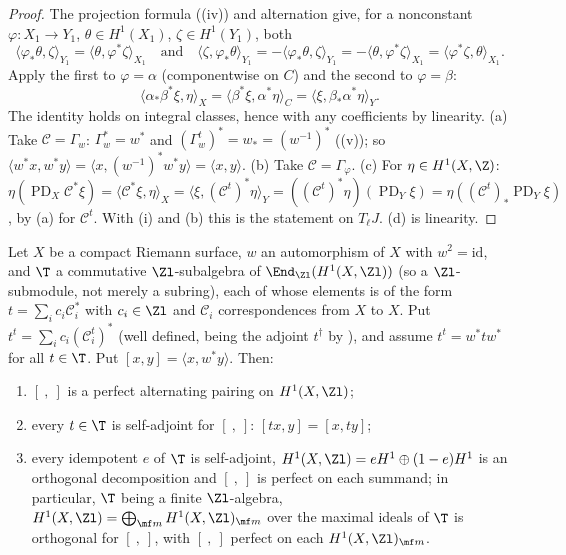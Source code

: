 \begin{proof}
The projection formula ((iv)) and alternation give, for a nonconstant $\varphi\colon X_1\to Y_1$, $\theta\in H^1(X_1)$, $\zeta\in H^1(Y_1)$, both
\[
\langle\varphi_*\theta,\zeta\rangle_{Y_1}=\langle\theta,\varphi^*\zeta\rangle_{X_1}\quad\text{and}\quad\langle\zeta,\varphi_*\theta\rangle_{Y_1}=-\langle\varphi_*\theta,\zeta\rangle_{Y_1}=-\langle\theta,\varphi^*\zeta\rangle_{X_1}=\langle\varphi^*\zeta,\theta\rangle_{X_1}.
\]
Apply the first to
$\varphi=\alpha$ (componentwise on $C$) and the second to $\varphi=\beta$:
\[
\langle\alpha_*\beta^*\xi,\eta\rangle_X=\langle\beta^*\xi,\alpha^*\eta\rangle_C=\langle\xi,\beta_*\alpha^*\eta\rangle_Y.
\]
The identity holds on integral classes, hence with any coefficients by linearity.
(a) Take $\mathcal C=\Gamma_w$: $\Gamma_w^*=w^*$ and $(\Gamma_w^t)^*=w_*=(w^{-1})^*$ ((v)); so $\langle w^*x,w^*y\rangle=\langle x,(w^{-1})^*w^*y\rangle=\langle x,y\rangle$.
(b) Take $\mathcal C=\Gamma_\varphi$. (c) For $\eta\in H^1(X,\Z)$: $\eta(\operatorname{PD}_X\mathcal C^*\xi)=\langle\mathcal C^*\xi,\eta\rangle_X=\langle\xi,(\mathcal C^t)^*\eta\rangle_Y=((\mathcal C^t)^*\eta)(\operatorname{PD}_Y\xi)=\eta((\mathcal C^t)_*\operatorname{PD}_Y\xi)$,
by (a) for $\mathcal C^t$. With (i) and (b) this is the statement on $T_\ell J$. (d) is linearity.
\end{proof}

\begin{corollary}\label{cor:curves:twisted-pairing}
Let $X$ be a compact Riemann surface, $w$ an automorphism of $X$ with $w^2=\mathrm{id}$, and $\T$ a commutative $\Zl$-subalgebra of $\End_{\Zl}(H^1(X,\Zl))$ (so a $\Zl$-submodule, not merely a subring), each of whose elements is of the form $t=\sum_ic_i\mathcal C_i^*$
with $c_i\in\Zl$ and $\mathcal C_i$ correspondences from $X$ to $X$. Put $t^t=\sum_ic_i(\mathcal C_i^t)^*$ (well defined, being the adjoint $t^\dagger$ by ), and
assume $t^t=w^*tw^*$ for all $t\in\T$. Put $[x,y]=\langle x,w^*y\rangle$. Then:
\begin{enumerate}[label=(\roman*)]
\item $[\ ,\ ]$ is a perfect alternating pairing on $H^1(X,\Zl)$;
\item every $t\in\T$ is self-adjoint for $[\ ,\ ]$: $[tx,y]=[x,ty]$;
\item every idempotent $e$ of $\T$ is self-adjoint, $H^1(X,\Zl)=eH^1\oplus(1-e)H^1$ is an orthogonal decomposition and $[\ ,\ ]$ is perfect on each summand; in particular, $\T$ being a finite
$\Zl$-algebra, $H^1(X,\Zl)=\bigoplus_{\mf m}H^1(X,\Zl)_{\mf m}$ over the maximal ideals of $\T$ is orthogonal for $[\ ,\ ]$, with $[\ ,\ ]$ perfect on each $H^1(X,\Zl)_{\mf m}$.
\end{enumerate}
\end{corollary}

